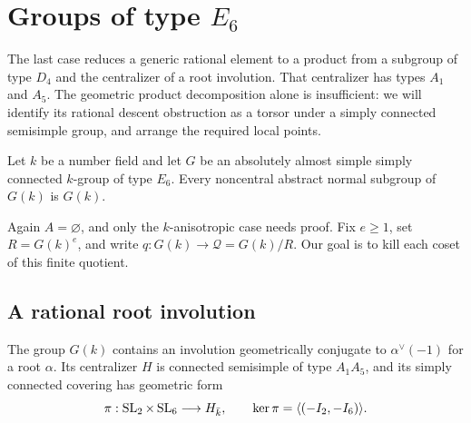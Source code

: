 \section{Groups of type \texorpdfstring{$E_6$}{E6}}\label{sec:e6}

The last case reduces a generic rational element to a product from a
subgroup of type $D_4$ and the centralizer of a root involution.  That
centralizer has types $A_1$ and $A_5$.  The geometric product
decomposition alone is insufficient: we will identify its rational
descent obstruction as a torsor under a simply connected semisimple
group, and arrange the required local points.

\begin{theorem}\label{thm:e6}
Let $k$ be a number field and let $G$ be an absolutely almost simple simply
connected $k$-group of type $E_6$.  Every noncentral abstract normal
subgroup of $G(k)$ is $G(k)$.
\end{theorem}

Again $A=\varnothing$, and only the $k$-anisotropic case needs proof.
Fix $e\ge1$, set $R=G(k)^e$, and write
$q:G(k)\to\mathcal Q=G(k)/R$.  Our goal is to kill each coset of this
finite quotient.

\subsection{A rational root involution}

\begin{lemma}\label{lem:e6-root-involution}
The group $G(k)$ contains an involution geometrically conjugate to
$\alpha^\vee(-1)$ for a root $\alpha$.  Its centralizer $H$ is connected
semisimple of type $A_1A_5$, and its simply connected covering has
geometric form
\begin{equation}\label{eq:e6-centralizer-cover}
 \pi:\operatorname{SL}_2\times\operatorname{SL}_6\longrightarrow H_{\bar k},
 \qquad \ker\pi=\langle(-I_2,-I_6)\rangle.
\end{equation}
\end{lemma}

